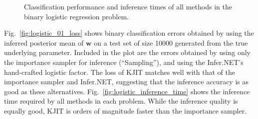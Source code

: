 \documentclass[english]{article}
\theoremstyle{plain}
\theoremstyle{plain}
\newcommand{\figref}[1]{Fig.~\ref{#1}}
\begin{document}
\begin{figure}[t]
  \centering
  \caption{Classification performance and inference times of all methods in the 
  binary logistic regression problem. 
  }
  \label{fig:logistic_performance}
\end{figure}


\figref{fig:logistic_01_loss} shows binary classification errors obtained by 
using the inferred posterior mean of $\boldsymbol{w}$ on a test set of size 
10000 generated from the true underlying parameter. 
Included in the plot are the errors obtained by using only the importance 
sampler for inference (``Sampling''), and using the Infer.NET's 
hand-crafted logistic factor. The loss of KJIT matches well with that of 
the importance sampler and Infer.NET, suggesting that the inference accuracy
is as good as these alternatives. \figref{fig:logistic_inference_time} 
shows the inference time required by all methods in each problem. 
While the inference quality is equally good, KJIT is orders of magnitude faster 
than the importance sampler. 
\end{document}
